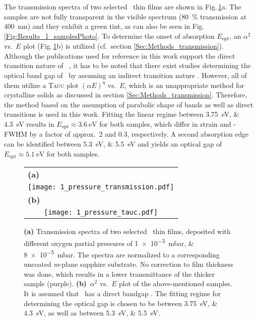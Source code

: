 The transmission spectra of two selected \cro\ thin films are shown in Fig.\,\ref{Fig:Results_1_transmission}a.
The samples are not fully transparent in the visible spectrum (\qty{80}{\percent} transmission at \qty{400}{\nm}) and they exhibit a green tint, as can also be seen in Fig.\,\ref{Fig:Results_1_samplesPhoto}.
To determine the onset of absorption $E_\mathrm{opt}$, an $\alpha^2$ vs.\ $E$ plot (Fig.\,\ref{Fig:Results_1_transmission}b) is utilized (cf.\ section \ref{Sec:Methods_transmission}).
Although the publications used for reference in this work support the direct transition nature of \cro\ 
    \cite{farrell2015,mi2018},
it has to be noted that there exist studies determining the optical band gap of \cro\ by assuming an indirect transition nature 
    \cite{cheng1996,al-kuhaili2007}.
However, all of them utilize a \textsc{Tauc} plot $(\alpha E)^\eta$ vs.\ $E$, which is an unappropriate method for crystalline solids as discussed in section \ref{Sec:Methods_transmission}.
Therefore, the method based on the assumption of parabolic shape of bands as well as direct transitions is used in this work.
Fitting the linear regime between \qtylist{3.75;4.3}{\eV} results in $E_\mathrm{opt}\approx\qty{3.6}{\eV}$ for both samples, which differ in strain and \textomega-FWHM by a factor of approx.\ 2 and 0.3, respectively.
A second absorption edge can be identified between \qtylist{5.3;5.5}{\eV} and yields an optical gap of $E_\mathrm{opt}\approx\qty{5.1}{\eV}$ for both samples.
\begin{figure}[ht]
    \centering
    \begin{tabular}{c}
        \multicolumn{1}{l}{\textbf{(a)}}\figSpace\\
        \texttt{[image: 1\_pressure\_transmission.pdf]}\figSpace\\
        \multicolumn{1}{l}{\textbf{(b)}}\figSpace\\
        \texttt{[image: 1\_pressure\_tauc.pdf]}
    \end{tabular}
    \caption{\textbf{(a)} Transmission spectra of two selected \cro\ thin films, deposited with different oxygen partial pressures of \qtylist{1e-3;8e-5}{\milli\bar}.
    The spectra are normalized to a corresponding uncoated \textit{m}-plane sapphire substrate.
    No correction to film thickness was done, which results in a lower transmittance of the thicker sample (purple).
    \textbf{(b)}~$\alpha^2$ vs.\ $E$ plot of the above-mentioned samples.
    It is assumed that \cro\ has a direct bandgap
        \cite{farrell2015,mi2018}.
    The fitting regime for determining the optical gap is chosen to be between \qtylist{3.75;4.3}{\eV}, as well as between \qtylist{5.3;5.5}{\eV}.
    }
    \label{Fig:Results_1_transmission}
\end{figure}
